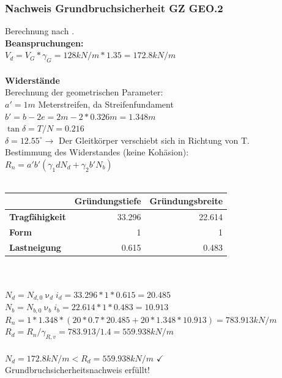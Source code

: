 \documentclass[11pt,fleqn,a4paper,halfparskip]{article}
\begin{document}
\subsubsection{Nachweis Grundbruchsicherheit GZ GEO.2}
Berechnung nach \cite[S.99]{wsp}. \\
\textbf{Beanspruchungen:}\\
$V_d = V_G*\gamma_G = 128kN/m * 1.35 = 172.8kN/m$ \\
\\
\textbf{Widerstände}\\
Berechnung der geometrischen Parameter: \\
$ a' = 1m$ Meterstreifen, da Streifenfundament \\
$ b' = b - 2e = 2m - 2*0.326m = 1.348m$ \\
$ \tan\delta = T/N = 0.216 $ \\
$ \delta = 12.55^\circ \rightarrow$ Der Gleitkörper verschiebt sich in Richtung von T. 
\\
Bestimmung des Widerstandes (keine Kohäsion): \\
$R_n = a'b' (\gamma_1 d N_d + \gamma_2 b' N_b)$\\
\\
\begin{tabular}{|l|r|r|}
\hline
 & \multicolumn{1}{l|}{\textbf{Gründungstiefe}} & \multicolumn{1}{l|}{\textbf{Gründungsbreite}} \\ \hline
\textbf{Tragfähigkeit} & 33.296 & 22.614 \\ \hline
\textbf{Form} & 1 & 1 \\ \hline
\textbf{Lastneigung} & 0.615 & 0.483 \\ \hline
\end{tabular}\\
\\
$ N_d = N_{d,0} \upnu_d i_d = 33.296 * 1 * 0.615 = 20.485$ \\
$ N_b = N_{b,0} \upnu_b i_b = 22.614 * 1 * 0.483 = 10.913$ \\
$ R_n = 1 * 1.348 * (20 * 0.7 * 20.485 + 20 * 1.348 * 10.913) = 783.913kN/m$\\
$R_d = R_n/\gamma_{R,v} = 783.913  / 1.4 = 559.938kN/m$ \\
\\
$N_d = 172.8kN/m < R_d = 559.938kN/m$ $\checkmark$ \\
Grundbruchsicherheitsnachweis erfüllt!
\end{document}
